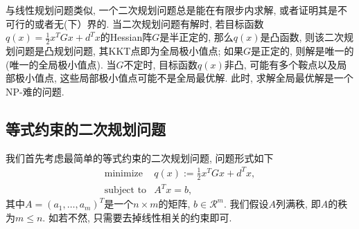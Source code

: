 \documentclass{SBCbookchapter}
\newcommand{\R}{\mathcal{R}}
\numberwithin{equation}{section}
\begin{document}
与线性规划问题类似, 一个二次规划问题总是能在有限步内求解, 或者证明其是不可行的或者无(下）界的. 当二次规划问题有解时, 若目标函数$q(x) = \frac{1}{2} x^T G x + d^T x$的Hessian阵$G$是半正定的, 那么$q(x)$是凸函数, 则该二次规划问题是凸规划问题, 其KKT点即为全局极小值点; 如果$G$是正定的, 则解是唯一的(唯一的全局极小值点). 当$G$不定时, 目标函数$q(x)$非凸, 可能有多个鞍点以及局部极小值点, 这些局部极小值点可能不是全局最优解. 此时, 求解全局最优解是一个NP-难的问题\cite{Murty_1987}.


\subsection{等式约束的二次规划问题}
\label{subsec:7.2.1}

我们首先考虑最简单的等式约束的二次规划问题, 问题形式如下
\begin{equation}
\label{eq:quadratic-programming-eq-constrained}
\begin{array}{cl}
\text{minimize} & q(x) := \frac{1}{2} x^T G x + d^T x, \\
\text{subject to} & A^T x = b,
\end{array}
\end{equation}
其中$A = (a_1, \ldots, a_m)^T$是一个$n \times m$的矩阵, $b\in \R^m.$ 我们假设$A$列满秩, 即$A$的秩为$m \leqslant n.$ 如若不然, 只需要去掉线性相关的约束即可.
\end{document}
